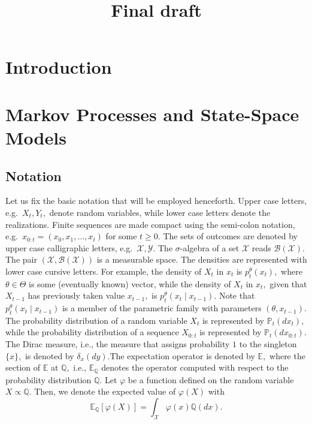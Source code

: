 \documentclass[
]{book}
\title{Final draft}
\author{}
\date{\vspace{-2.5em}}
\theoremstyle{break}
\theoremstyle{nonumberplain}
\begin{document}
\frontmatter
\maketitle

\mainmatter
\chapter*{Introduction}

\chapter{Markov Processes and State-Space Models}
\section{Notation}

Let us fix the basic notation that will be employed henceforth. Upper
case letters, e.g.~\(X_t, Y_t,\) denote random variables, while lower
case letters denote the realizations. Finite sequences are made compact
using the semi-colon notation, e.g.~\(x_{0:t}=(x_0, x_1, \dots, x_t)\)
for some \(t \geq 0.\) The sets of outcomes are denoted by upper case
calligraphic letters, e.g.~\(\mathcal{X}, \mathcal{Y}.\) The
\(\sigma\)-algebra of a set \(\mathcal{X}\) reads
\(\mathcal{B}(\mathcal{X}).\) The pair
\((\mathcal{X}, \mathcal{B}(\mathcal{X}))\) is a measurable space. The
densities are represented with lower case cursive letters. For example,
the density of \(X_t\) in \(x_t\) is \(p_t^\theta(x_t),\) where
\(\theta\in\Theta\) is some (eventually known) vector, while the density
of \(X_t\) in \(x_t,\) given that \(X_{t-1}\) has previously taken value
\(x_{t-1},\) is \(p_t^\theta(x_t\mid x_{t-1}).\) Note that
\(p_t^\theta(x_t\mid x_{t-1})\) is a member of the parametric family
with parameters \((\theta, x_{t-1})\). The probability distribution of a
random variable \(X_t\) is represented by \(\mathbb{P}_t(dx_t),\) while
the probability distribution of a sequence \(X_{0:t}\) is represented by
\(\mathbb{P}_t(dx_{0:t}).\) The Dirac measure, i.e., the measure that
assigns probability \(1\) to the singleton \(\{x\},\) is denoted by
\(\delta_x(dy)\).The expectation operator is denoted by \(\mathbb{E},\)
where the section of \(\mathbb{E}\) at \(\mathbb{Q},\) i.e.,
\(\mathbb{E}_{\mathbb{Q}}\) denotes the operator computed with respect
to the probability distribution \(\mathbb{Q}.\) Let \(\varphi\) be a
function defined on the random variable \(X\propto\mathbb{Q}.\) Then, we
denote the expected value of \(\varphi(X)\) with \[
    \mathbb{E}_{\mathbb{Q}}[\varphi(X)]=
    \int_{\mathcal{X}}\varphi(x)\mathbb{Q}(dx).
\]
\end{document}
